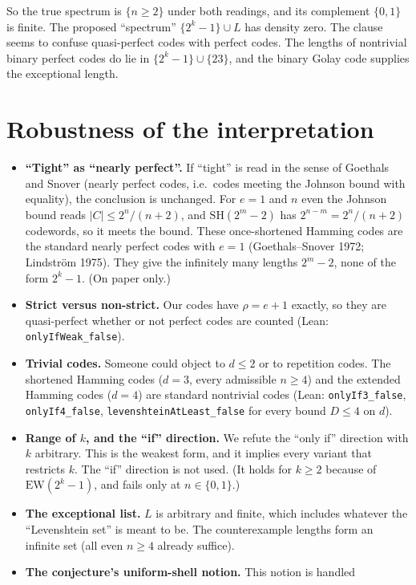 \documentclass[11pt]{article}
\theoremstyle{definition}
\theoremstyle{remark}
\begin{document}
So the true spectrum is $\{n\ge 2\}$ under both readings, and its complement $\{0,1\}$ is
finite. The proposed ``spectrum'' $\{2^k-1\}\cup L$ has density zero. The
clause seems to confuse quasi-perfect codes with perfect codes. The lengths of
nontrivial binary perfect codes do lie in $\{2^k-1\}\cup\{23\}$, and the binary
Golay code supplies the exceptional length.

\section{Robustness of the interpretation}\label{sec:readings}
\begin{itemize}
\item \textbf{``Tight'' as ``nearly perfect''.} If ``tight'' is read in the
sense of Goethals and Snover (nearly perfect codes, i.e.\ codes meeting the
Johnson bound with equality), the conclusion is unchanged. For $e=1$ and $n$
even the Johnson bound reads $|C|\le 2^n/(n+2)$, and $\mathrm{SH}(2^m-2)$ has
$2^{n-m}=2^n/(n+2)$ codewords, so it meets the bound. These once-shortened
Hamming codes are the standard nearly perfect codes with $e=1$ (Goethals--Snover
1972; Lindstr\"om 1975). They give the infinitely many lengths $2^m-2$, none of the
form $2^k-1$. (On paper only.)
\item \textbf{Strict versus non-strict.} Our codes have $\rho=e+1$ exactly, so
they are quasi-perfect whether or not perfect codes are counted
(Lean: \texttt{onlyIfWeak\_false}).
\item \textbf{Trivial codes.} Someone could object to $d\le 2$ or to
repetition codes. The shortened Hamming codes ($d=3$, every admissible
$n\ge 4$) and the extended Hamming codes ($d=4$) are standard nontrivial codes
(Lean: \texttt{onlyIf3\_false}, \texttt{onlyIf4\_false},
\texttt{levenshteinAtLeast\_false} for every bound $D\le 4$ on $d$).
\item \textbf{Range of $k$, and the ``if'' direction.} We refute the ``only
if'' direction with $k$ arbitrary. This is the weakest form, and it implies
every variant that restricts $k$. The ``if'' direction is not used. (It holds
for $k\ge 2$ because of $\mathrm{EW}(2^k-1)$, and fails only at $n\in\{0,1\}$.)
\item \textbf{The exceptional list.} $L$ is arbitrary and finite, which
includes whatever the ``Levenshtein set'' is meant to be. The counterexample
lengths form an infinite set (all even $n\ge 4$ already suffice).
\item \textbf{The conjecture's uniform-shell notion.} This notion is handled

\end{itemize}
\end{document}
